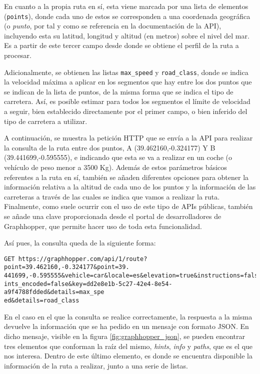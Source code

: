 \documentclass[11pt,spanish,listoffigures,listoftables]{tfgetsinf}
\begin{document}
En cuanto a la propia ruta en sí, esta viene marcada por una lista de elementos (\verb|points|), donde cada uno de estos se corresponden a una coordenada geográfica (o \textit{punto}, por tal y como se referencia en la documentación de la API), incluyendo esta su latitud, longitud y altitud (en metros) sobre el nivel del mar. Es a partir de este tercer campo desde donde se obtiene el perfil de la ruta a procesar.

Adicionalmente, se obtienen las listas \verb|max_speed| y \verb|road_class|, donde se indica la velocidad máxima a aplicar en los segmentos que hay entre los dos puntos que se indican de la lista de puntos, de la misma forma que se indica el tipo de carretera. Así, es posible estimar para todos los segmentos el límite de velocidad a seguir, bien establecido directamente por el primer campo, o bien inferido del tipo de carretera a utilizar.

A continuación, se muestra la petición HTTP que se envía a la API para realizar la consulta de la ruta entre dos puntos, A (39.462160,-0.324177) Y B (39.441699,-0.595555), e indicando que esta se va a realizar en un coche (o vehículo de peso menor a 3500 Kg). Además de estos parámetros básicos referentes a la ruta en sí, también se añaden diferentes opciones para obtener la información relativa a la altitud de cada uno de los puntos y la información de las carreteras a través de las cuales se indica que vamos a realizar la ruta. Finalmente, como suele ocurrir con el uso de este tipo de APIs públicas, también se añade una clave proporcionada desde el portal de desarrolladores de Graphhopper, que permite hacer uso de toda esta funcionalidad.

\noindent Así pues, la consulta queda de la siguiente forma:
\begin{verbatim}
GET https://graphhopper.com/api/1/route?point=39.462160,-0.324177&point=39.
441699,-0.595555&vehicle=car&locale=es&elevation=true&instructions=false&po
ints_encoded=false&key=dd2e8e1b-5c27-42e4-8e54-a9f4788fdded&details=max_spe
ed&details=road_class
\end{verbatim}

En el caso en el que la consulta se realice correctamente, la respuesta a la misma devuelve la información que se ha pedido en un mensaje con formato JSON. En dicho mensaje, visible en la figura \ref{fig:graphhopper_json}, se pueden encontrar tres elementos que conforman la raíz del mismo, \textit{hints}, \textit{info} y \textit{paths}, que es el que nos interesa. Dentro de este último elemento, es donde se encuentra disponible la información de la ruta a realizar, junto a una serie de listas.
\end{document}
